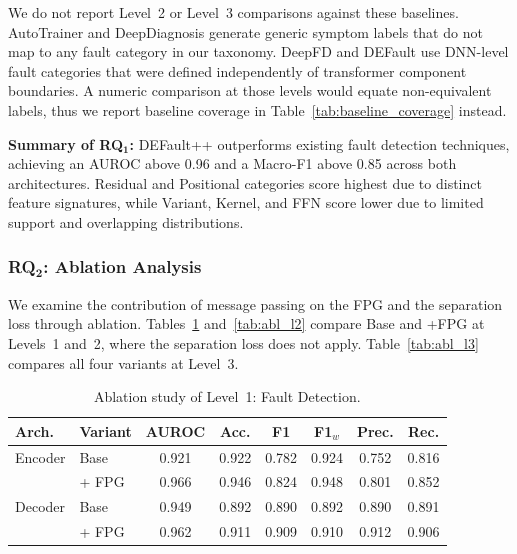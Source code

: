 We do not report Level~2 or Level~3 comparisons against these baselines.
AutoTrainer and DeepDiagnosis generate generic symptom labels that do not map to any fault category in our taxonomy.
DeepFD and DEFault use DNN-level fault categories that were defined independently of transformer component boundaries.
A numeric comparison at those levels would equate non-equivalent labels, thus we report baseline coverage in Table~\ref{tab:baseline_coverage} instead.

\begin{rqsummary}
\textbf{Summary of RQ$\mathbf{_1}$:} DEFault++ outperforms existing fault detection techniques, achieving an AUROC above 0.96 and a Macro-F1 above 0.85 across both architectures. Residual and Positional categories score highest due to distinct feature signatures, while Variant, Kernel, and FFN score lower due to limited support and overlapping distributions.
\end{rqsummary}

\subsubsection{\textbf{RQ$\mathbf{_2}$:} Ablation Analysis}
\label{sec:defaultpp_rq2}

We examine the contribution of message passing on the FPG and the separation loss through ablation. Tables~\ref{tab:abl_l1} and~\ref{tab:abl_l2} compare Base and +FPG at Levels~1 and~2, where the separation loss does not apply. Table~\ref{tab:abl_l3} compares all four variants at Level~3.

\begin{table}[t]
\centering
\caption{Ablation study of Level~1: Fault Detection.}
\label{tab:abl_l1}
\small
\begin{tabular}{l l c c c c c c}
\toprule
\textbf{Arch.} & \textbf{Variant} & \textbf{AUROC} & \textbf{Acc.} & \textbf{F1} & \textbf{F1$_w$} & \textbf{Prec.} & \textbf{Rec.} \\
\midrule
Encoder & Base & 0.921 & 0.922 & 0.782 & 0.924 & 0.752 & 0.816 \\
        & + FPG & 0.966 & 0.946 & 0.824 & 0.948 & 0.801 & 0.852 \\
\midrule
Decoder & Base & 0.949 & 0.892 & 0.890 & 0.892 & 0.890 & 0.891 \\
        & + FPG & 0.962 & 0.911 & 0.909 & 0.910 & 0.912 & 0.906 \\
\bottomrule
\end{tabular}
\end{table}

